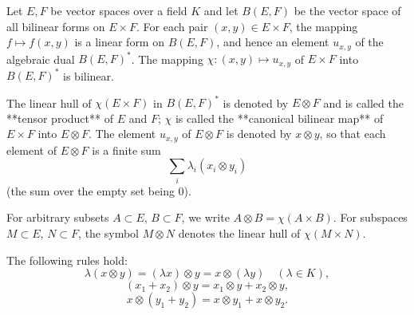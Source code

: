 Let $E, F$ be vector spaces over a field $K$ and let $B(E, F)$ be the vector space of all bilinear forms on $E \times F$. For each pair $(x, y) \in E \times F$, the mapping $f \mapsto f(x, y)$ is a linear form on $B(E, F)$, and hence an element $u_{x,y}$ of the algebraic dual $B(E, F)^*$. The mapping $\chi: (x, y) \mapsto u_{x,y}$ of $E \times F$ into $B(E, F)^*$ is bilinear.

The linear hull of $\chi(E \times F)$ in $B(E, F)^*$ is denoted by $E \otimes F$ and is called the **tensor product** of $E$ and $F$; $\chi$ is called the **canonical bilinear map** of $E \times F$ into $E \otimes F$. The element $u_{x,y}$ of $E \otimes F$ is denoted by $x \otimes y$, so that each element of $E \otimes F$ is a finite sum
$$\sum_i \lambda_i (x_i \otimes y_i)$$
(the sum over the empty set being $0$).

For arbitrary subsets $A \subset E$, $B \subset F$, we write $A \otimes B = \chi(A \times B)$. For subspaces $M \subset E$, $N \subset F$, the symbol $M \otimes N$ denotes the linear hull of $\chi(M \times N)$.

The following rules hold:
$$\lambda(x \otimes y) = (\lambda x) \otimes y = x \otimes (\lambda y) \quad (\lambda \in K),$$
$$(x_1 + x_2) \otimes y = x_1 \otimes y + x_2 \otimes y,$$
$$x \otimes (y_1 + y_2) = x \otimes y_1 + x \otimes y_2.$$
